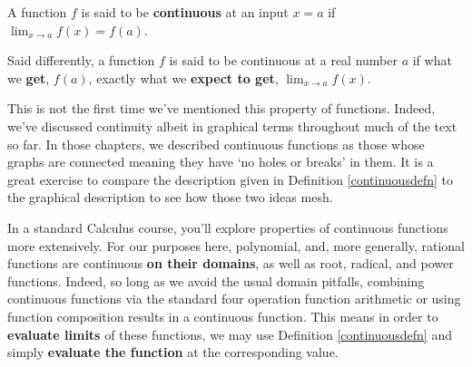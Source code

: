 \documentclass{ximera}
\begin{document}

\begin{definition}  \label{continuousdefn}  A function $f$ is said to be \textbf{continuous} at an input $x  = a$ if $\lim_{x \rightarrow a} f(x) = f(a)$.  



Said differently, a function $f$ is said to be continuous at a real number $a$ if what we \textbf{get}, $f(a)$, exactly what we \textbf{expect to get}, $\lim_{x \rightarrow a} f(x)$. 


\end{definition}




 This is not the first time we've mentioned this property of functions.  Indeed, we've discussed continuity albeit in graphical terms throughout much of the text so far.  In those chapters, we described continuous functions as those whose graphs are connected meaning they have  `no holes or breaks' in them.  It is a great exercise to compare the description given in Definition \ref{continuousdefn} to the graphical description to see how those two ideas mesh.
 
 
 
 In a standard Calculus course, you'll explore properties of continuous functions more extensively.  For our purposes here, polynomial, and, more generally, rational functions are continuous \textbf{on their domains}, as well as root, radical, and power functions.  Indeed, so long as we avoid the usual domain pitfalls, combining continuous functions via the standard four operation function arithmetic or using function composition results in a continuous function.  This means in order to \textbf{evaluate limits} of these functions, we may use Definition \ref{continuousdefn} and simply \textbf{evaluate the function} at the corresponding value.
\end{document}
